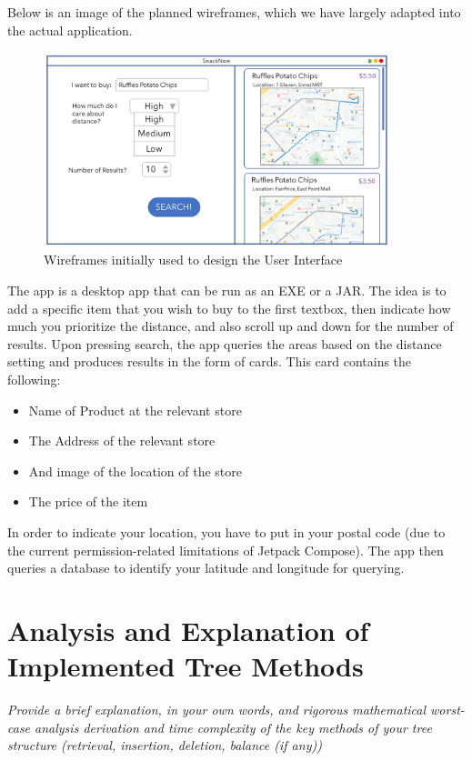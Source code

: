 \documentclass[12pt]{article}
\begin{document}
{Below is an image of the planned wireframes, which we have largely adapted into the actual application.

\begin{figure}[H]
    \centering
    \includegraphics[width=0.9\textwidth]{img/wireframe.png}
    \caption{Wireframes initially used to design the User Interface}
    \label{fig:wireframes}
\end{figure}

The app is a desktop app that can be run as an EXE or a JAR. The idea is to add a specific item that you wish to buy to the first textbox, then indicate how much you prioritize the distance, and also scroll up and down for the number of results. Upon pressing search, the app queries the areas based on the distance setting and produces results in the form of cards. This card contains the following:
\begin{itemize}
    \item Name of Product at the relevant store
    \item The Address of the relevant store
    \item And image of the location of the store
    \item The price of the item
\end{itemize}

In order to indicate your location, you have to put in your postal code (due to the current permission-related limitations of Jetpack Compose). The app then queries a database to identify your latitude and longitude for querying.

\section{Analysis and Explanation of Implemented Tree Methods}

\textit{Provide a brief explanation, in your own words, and rigorous mathematical worst-case analysis derivation and time complexity of the key methods of your tree structure (retrieval, insertion, deletion, balance (if any))}



}
\end{document}
